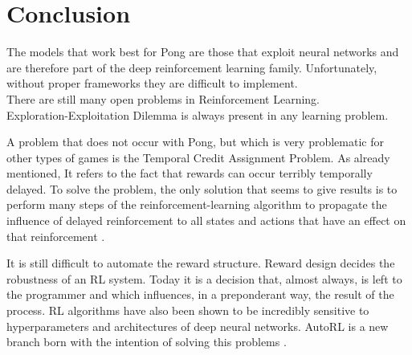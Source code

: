 \section{Conclusion}
The models that work best for Pong are those that exploit neural networks and are therefore part of the deep reinforcement learning family.
Unfortunately, without proper frameworks they are difficult to implement. \\

There are still many open problems in Reinforcement Learning. \\

Exploration-Exploitation Dilemma is always present in any learning problem.

A problem that does not occur with Pong, but which is very problematic for other types of games is the Temporal Credit Assignment Problem. As already mentioned, It refers to the fact that rewards can occur terribly temporally delayed. To solve the problem, the only solution that seems to give results is to perform many steps of the reinforcement-learning algorithm to propagate the influence of delayed reinforcement to all states and actions that have an effect on that reinforcement \cite{sutton1984temporal}. 

It is still difficult to automate the reward structure. Reward design decides the robustness of an RL system.
Today it is a decision that, almost always, is left to the programmer and which influences, 
in a preponderant way, the result of the process. 
RL algorithms have also been shown to be incredibly sensitive to hyperparameters and
architectures of deep neural networks. AutoRL is a new branch born with the intention of solving this problems \cite{parker2022automated}.
